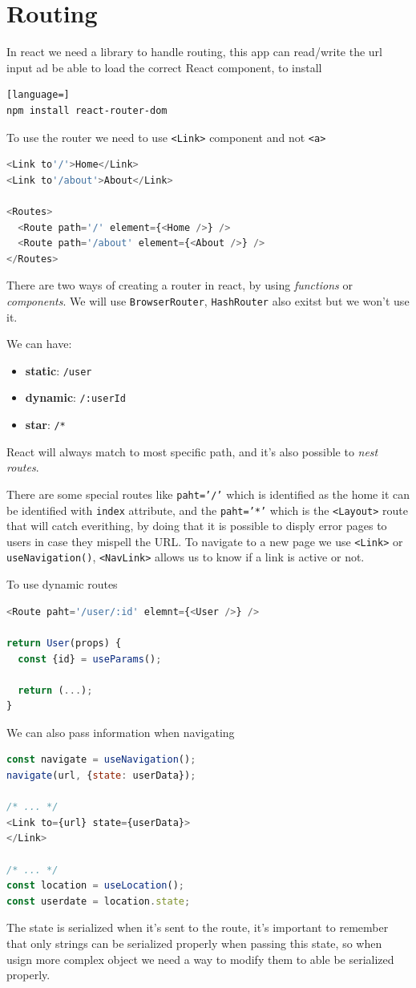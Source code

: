 \documentclass[12pt]{article}
\begin{document}
\newpage
\section{Routing}
In react we need a library to handle routing, this app can read/write the url input ad be able to load the correct React component, to install
\begin{lstlisting}[language=]
npm install react-router-dom
\end{lstlisting}
To use the router we need to use \texttt{<Link>} component and not \texttt{<a>}
\begin{lstlisting}[language=js]
<Link to'/'>Home</Link>
<Link to'/about'>About</Link>

<Routes>
  <Route path='/' element={<Home />} />
  <Route path='/about' element={<About />} />
</Routes>
\end{lstlisting}
There are two ways of creating a router in react, by using \emph{functions} or \emph{components}. We will use \texttt{BrowserRouter}, \texttt{HashRouter} also exitst but we won't use it.

We can have:
\begin{itemize}
  \item \textbf{static}: \texttt{/user}
  \item \textbf{dynamic}: \texttt{/:userId}
  \item \textbf{star}: \texttt{/*}
\end{itemize}
React will always match to most specific path, and it's also possible to \emph{nest routes}.

There are some special routes like \texttt{paht='/'} which is identified as the home it can be identified with \texttt{index} attribute, and the \texttt{paht='*'} which is the \texttt{<Layout>} route that will catch everithing, by doing that it is possible to disply error pages to users in case they mispell the URL. To navigate to a new page we use \texttt{<Link>} or \texttt{useNavigation()}, \texttt{<NavLink>} allows us to know if a link is active or not.

To use dynamic routes
\begin{lstlisting}[language=js]
<Route paht='/user/:id' elemnt={<User />} />

return User(props) {
  const {id} = useParams();
  
  return (...);
}
\end{lstlisting}
We can also pass information when navigating
\begin{lstlisting}[language=js]
const navigate = useNavigation();
navigate(url, {state: userData});

/* ... */
<Link to={url} state={userData}>
</Link>

/* ... */
const location = useLocation();
const userdate = location.state;
\end{lstlisting}
The state is serialized when it's sent to the route, it's important to remember that only strings can be serialized properly when passing this state, so when usign more complex object we need a way to modify them to able be serialized properly.
\end{document}

